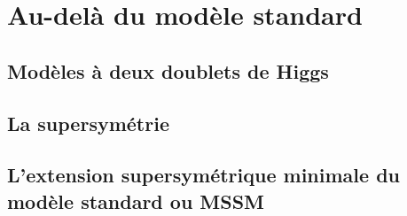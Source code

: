 \section{Au-delà du modèle standard}
\subsection{Modèles à deux doublets de Higgs}
\subsection{La supersymétrie}
\subsection{L'extension supersymétrique minimale du modèle standard ou MSSM}

